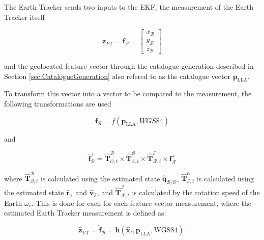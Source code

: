 The Earth Tracker sends two inputs to the EKF, the measurement of the Earth Tracker itself 

\begin{equation}
    \mathbf{z}_{ET} = \mathbf{f}_\mathcal{B} =
    \begin{bmatrix}
        x_\mathcal{B} \\
        y_\mathcal{B} \\
        z_\mathcal{B}
    \end{bmatrix}
\end{equation}

\noindent
and the geolocated feature vector through the catalogue generation described in Section \ref{sec:CatalogueGeneration} also refered to as the catalogue vector 
$\mathbf{p}_\text{LLA}$.
\vspace{0.5cm}

\noindent
To transform this vector into a vector to be compared to the measurement, the following transformations are used

\begin{equation}
    \mathbf{f}_\mathcal{R} = f(\mathbf{p}_\text{LLA},WGS84)
\end{equation}

\noindent
and

\begin{equation}
    \mathbf{\hat{f}}_\mathcal{B}^+ = \mathbf{\hat{T}}_{\mathcal{O},t}^\mathcal{B} \times \mathbf{\hat{T}}_{\mathcal{I},t}^\mathcal{O} \times \mathbf{\hat{T}}_{\mathcal{R},t}^\mathcal{I} \times \mathbf{f}_\mathcal{R}^+
    \label{Eq:CatalogueH2}
\end{equation}

\noindent
where $\mathbf{\hat{T}}_{\mathcal{O},t}^\mathcal{B}$ is calculated using the estimated state $\mathbf{\hat{q}}_\mathcal{B/O}$, $\mathbf{\hat{T}}_{\mathcal{I},t}^\mathcal{O}$ is
calculated using the estimated state $\mathbf{\hat{r}}_\mathcal{I}$ and $\mathbf{\hat{v}}_\mathcal{I}$, and $\mathbf{\hat{T}}_{\mathcal{R},t}^\mathcal{I}$ is calculated by the 
rotation speed of the Earth $\omega_e$. This is done for each for each feature vector measurement, where the estimated Earth Tracker measurement is defined as:

\begin{equation}
    \mathbf{\hat{z}}_\text{ET} = \mathbf{\hat{f}}_\mathcal{B} = \mathbf{h}(\mathbf{\hat{x}}_t,\mathbf{p}_\text{LLA},\text{WGS84})\text{.}
\end{equation}

\label{sec:GPSMeasModel}

